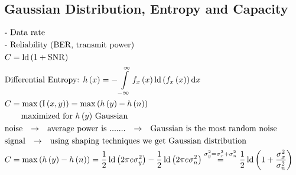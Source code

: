 \subsection*{Gaussian Distribution, Entropy and Capacity}
\begin{align*}
	&\text{- Data rate}& \\
	&\text{- Reliability (BER, transmit power)}& \\
	&C = \operatorname{ld}\left(1+\operatorname{SNR}\right)& \\
	&\text{Differential Entropy: } h\left(x\right)=-\int\limits_{-\infty}^{\infty}f_{x}\left(x\right)\operatorname{ld}\left(f_{x}\left(x\right)\right)\mathrm{d}x& \\
	&C=\max\left(\mathrm{I}\left(x,y\right)\right)=\max\left(h\left(y\right)-h\left(n\right)\right)& \\
	&\qquad\text{maximized for $h\left(y\right)$ Gaussian}& \\
	&\text{noise$\quad\rightarrow\quad$average power is .......$\quad\rightarrow\quad$Gaussian is the most random noise}& \\
	&\text{signal$\quad\rightarrow\quad$using shaping techniques we get Gaussian distribution}& \\
	&C=\max\left(h\left(y\right)-h\left(n\right)\right)=\frac{1}{2}\operatorname{ld}\left(2\pi e\sigma_{y}^{2}\right)-\frac{1}{2}\operatorname{ld}\left(2\pi e\sigma_{n}^{2}\right)\overset{\sigma_{y}^{2}=\sigma_{x}^{2}+\sigma_{n}^{2}}{=}\frac{1}{2}\operatorname{ld}\left(1+\frac{\sigma_{x}^{2}}{\sigma_{n}^{2}}\right)& \\
\end{align*}

